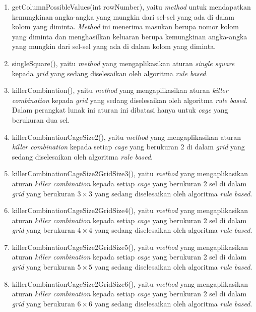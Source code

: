 \begin{enumerate}
\item getColumnPossibleValues(int rowNumber), yaitu \textit{method} untuk mendapatkan kemungkinan angka-angka yang mungkin dari sel-sel yang ada di dalam kolom yang diminta. \textit{Method} ini menerima masukan berupa nomor kolom yang diminta dan menghasilkan keluaran berupa kemungkinan angka-angka yang mungkin dari sel-sel yang ada di dalam kolom yang diminta.
\item singleSquare(), yaitu \textit{method} yang mengaplikasikan aturan \textit{single square} kepada \textit{grid} yang sedang diselesaikan oleh algoritma \textit{rule based}.
\item killerCombination(), yaitu \textit{method} yang mengaplikasikan aturan \textit{killer combination} kepada \textit{grid} yang sedang diselesaikan oleh algoritma \textit{rule based}. Dalam perangkat lunak ini aturan ini dibatasi hanya untuk \textit{cage} yang berukuran dua sel.
\item killerCombinationCageSize2(), yaitu \textit{method} yang mengaplikasikan aturan \textit{killer combination} kepada setiap \textit{cage} yang berukuran 2 di dalam \textit{grid} yang sedang diselesaikan oleh algoritma \textit{rule based}.
\item killerCombinationCageSize2GridSize3(), yaitu \textit{method} yang mengaplikasikan aturan \textit{killer combination} kepada setiap \textit{cage} yang berukuran 2 sel di dalam \textit{grid} yang berukuran \begin{math}3 \times 3\end{math} yang sedang diselesaikan oleh algoritma \textit{rule based}.
\item killerCombinationCageSize2GridSize4(), yaitu \textit{method} yang mengaplikasikan aturan \textit{killer combination} kepada setiap \textit{cage} yang berukuran 2 sel di dalam \textit{grid} yang berukuran \begin{math}4 \times 4\end{math} yang sedang diselesaikan oleh algoritma \textit{rule based}.
\item killerCombinationCageSize2GridSize5(), yaitu \textit{method} yang mengaplikasikan aturan \textit{killer combination} kepada setiap \textit{cage} yang berukuran 2 sel di dalam \textit{grid} yang berukuran \begin{math}5 \times 5\end{math} yang sedang diselesaikan oleh algoritma \textit{rule based}.
\item killerCombinationCageSize2GridSize6(), yaitu \textit{method} yang mengaplikasikan aturan \textit{killer combination} kepada setiap \textit{cage} yang berukuran 2 sel di dalam \textit{grid} yang berukuran \begin{math}6 \times 6\end{math} yang sedang diselesaikan oleh algoritma \textit{rule based}.

\end{enumerate}

